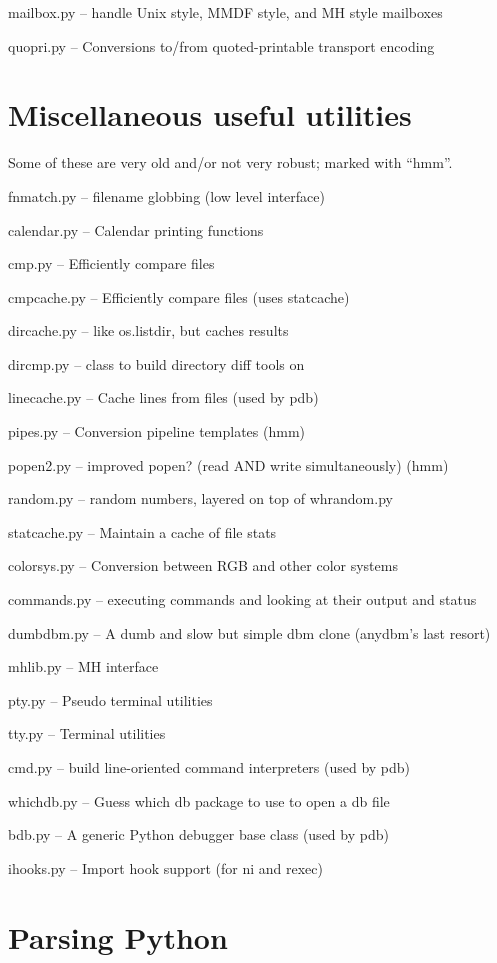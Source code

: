 mailbox.py -- handle Unix style, MMDF style, and MH style mailboxes

quopri.py -- Conversions to/from quoted-printable transport encoding


\section{Miscellaneous useful utilities}

Some of these are very old and/or not very robust; marked with ``hmm''.

fnmatch.py -- filename globbing (low level interface)

calendar.py -- Calendar printing functions

cmp.py -- Efficiently compare files

cmpcache.py -- Efficiently compare files (uses statcache)

dircache.py -- like os.listdir, but caches results

dircmp.py -- class to build directory diff tools on

linecache.py -- Cache lines from files (used by pdb)

pipes.py -- Conversion pipeline templates (hmm)

popen2.py -- improved popen? (read AND write simultaneously) (hmm)

random.py -- random numbers, layered on top of whrandom.py

statcache.py -- Maintain a cache of file stats

colorsys.py -- Conversion between RGB and other color systems

commands.py -- executing commands and looking at their output and
status

dumbdbm.py -- A dumb and slow but simple dbm clone (anydbm's last
resort)

mhlib.py -- MH interface

pty.py -- Pseudo terminal utilities

tty.py -- Terminal utilities

cmd.py -- build line-oriented command interpreters (used by pdb)

whichdb.py -- Guess which db package to use to open a db file

bdb.py -- A generic Python debugger base class (used by pdb)

ihooks.py -- Import hook support (for ni and rexec)


\section{Parsing Python}

